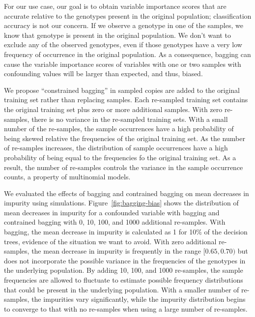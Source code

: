 For our use case, our goal is to obtain variable importance scores that are accurate relative to the genotypes present in the original population; classification accuracy is not our concern.  If we observe a genotype in one of the samples, we know that genotype is present in the original population. We don't want to exclude any of the observed genotypes, even if those genotypes have a very low frequency of occurrence in the original population.  As a consequence, bagging can cause the variable importance scores of variables with one or two samples with confounding values will be larger than expected, and thus, biased.

We propose ``constrained bagging'' in sampled copies are added to the original training set rather than replacing samples.  Each re-sampled training set contains the original training set plus zero or more additional samples.   With zero re-samples, there is no variance in the re-sampled training sets.  With a small number of the re-samples, the sample occurrences have a high probability of being skewed relative the frequencies of the original training set.  As the number of re-samples increases, the distribution of sample occurrences have a high probability of being equal to the frequencies fo the original training set.  As a result, the number of re-samples controls the variance in the sample occurrence counts, a property of multinomial models.

We evaluated the effects of bagging and contrained bagging on mean decreases in impurity using simulations.  Figure~\ref{fig:bagging-bias} shows the distribution of mean decreases in impurity for a confounded variable with bagging and contrained bagging with 0, 10, 100, and 1000 additional re-samples.  With bagging, the mean decrease in impurity is calculated as 1 for 10\% of the decision trees, evidence of the situation we want to avoid.  With zero additional re-samples, the mean decrease in impurity is frequently in the range $[0.65, 0.70)$ but does not incorporate the possible variance in the frequencies of the genotypes in the underlying population.  By adding 10, 100, and 1000 re-samples, the sample frequencies are allowed to fluctuate to estimate possible frequency distributions that could be present in the underlying population.  With a smaller number of re-samples, the impurities vary significantly, while the impurity distribution begins to converge to that with no re-samples when using a large number of re-samples.

